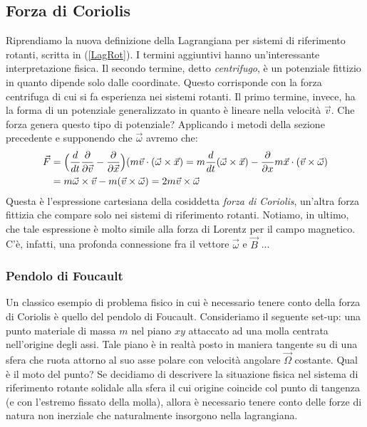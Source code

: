 \documentclass[a4paper,openany]{article}
\begin{document}
	\subsection{Forza di Coriolis}
	Riprendiamo la nuova definizione della Lagrangiana per sistemi di riferimento rotanti, scritta in (\ref{LagRot}). I termini aggiuntivi hanno un'interessante interpretazione fisica. Il secondo termine, detto \textit{centrifugo}, è un potenziale fittizio in quanto dipende solo dalle coordinate. Questo corrisponde con la forza centrifuga di cui si fa esperienza nei sistemi rotanti. Il primo termine, invece, ha la forma di un potenziale generalizzato in quanto è lineare nella velocità $\vec{v}$. Che forza genera questo tipo di potenziale? Applicando i metodi della sezione precedente e supponendo che $\vec{\omega}$ avremo che:
	\begin{equation}
		\begin{aligned}
			\vec{F} &= \Bigl(\dfrac{d}{dt}\dfrac{\partial}{\partial \vec{v}} - \dfrac{\partial}{\partial \vec{x}}\Bigl) (m\vec{v}\cdot(\vec{\omega}\times\vec{x}) = m\dfrac{d}{dt}(\vec{\omega}\times\vec{x}) - 
			\dfrac{\partial }{\partial x} m\vec{x}\cdot(\vec{v}\times\vec{\omega})
			\\
			\vspace{2cm}
			&= m\vec{\omega}\times\vec{v} - m(\vec{v}\times\vec{\omega}) = 2m\vec{v}\times\vec{\omega} \\
		\end{aligned}
		\label{ForzaCoriolis}
	\end{equation}
	Questa è l'espressione cartesiana della cosiddetta \textit{forza di Coriolis}, un'altra forza fittizia che compare solo nei sistemi di riferimento rotanti. Notiamo, in ultimo, che tale espressione è molto simile alla forza di Lorentz per il campo magnetico. C'è, infatti, una profonda connessione fra il vettore $\vec{\omega}$ e $\vec{B}$ ...
	\subsubsection{Pendolo di Foucault}
	Un classico esempio di problema fisico in cui è necessario tenere conto della forza di Coriolis è quello del pendolo di Foucault. Consideriamo il seguente set-up: una punto materiale di massa $m$ nel piano $xy$ attaccato ad una molla centrata nell'origine degli assi. Tale piano è in realtà posto in maniera tangente su di una sfera che ruota attorno al suo asse polare con velocità angolare $\vec{\Omega}$ costante. Qual è il moto del punto? Se decidiamo di descrivere la situazione fisica nel sistema di riferimento rotante solidale alla sfera il cui origine coincide col punto di tangenza (e con l'estremo fissato della molla), allora è necessario tenere conto delle forze di natura non inerziale che naturalmente insorgono nella lagrangiana. 
	
\end{document}
